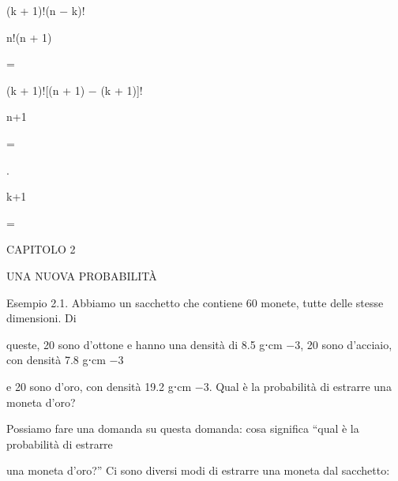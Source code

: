 \documentclass[a4paper,portrait,12pt]{article}
\begin{document}
\begin{flushleft}
(k + 1)!(n $-$ k)!
\end{flushleft}


\begin{flushleft}
n!(n + 1)
\end{flushleft}


=


\begin{flushleft}
(k + 1)![(n + 1) $-$ (k + 1)]!
\end{flushleft}


\begin{flushleft}
n+1
\end{flushleft}


=


.


\begin{flushleft}
k+1
\end{flushleft}


=





\begin{flushleft}
\newpage
CAPITOLO 2
\end{flushleft}


\begin{flushleft}
UNA NUOVA PROBABILIT\`{A}
\end{flushleft}


\begin{flushleft}
Esempio 2.1. Abbiamo un sacchetto che contiene 60 monete, tutte delle stesse dimensioni. Di
\end{flushleft}


\begin{flushleft}
queste, 20 sono d'ottone e hanno una densit\`{a} di 8.5 g⋅cm $-$3, 20 sono d'acciaio, con densit\`{a} 7.8 g⋅cm $-$3
\end{flushleft}


\begin{flushleft}
e 20 sono d'oro, con densit\`{a} 19.2 g⋅cm $-$3. Qual \`{e} la probabilit\`{a} di estrarre una moneta d'oro?
\end{flushleft}


\begin{flushleft}
Possiamo fare una domanda su questa domanda: cosa significa {``}qual \`{e} la probabilit\`{a} di estrarre
\end{flushleft}


\begin{flushleft}
una moneta d'oro?'' Ci sono diversi modi di estrarre una moneta dal sacchetto:
\end{flushleft}
\end{document}
